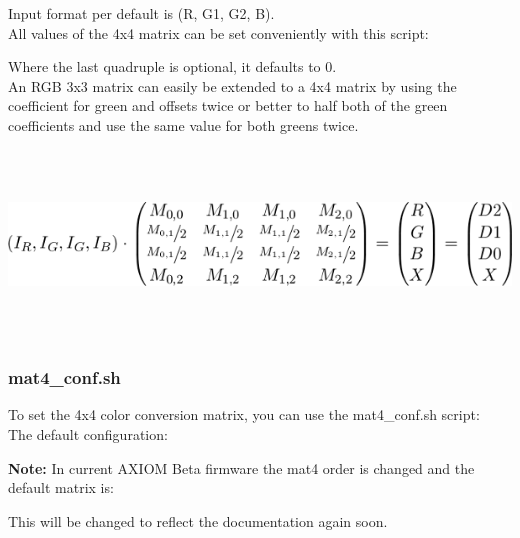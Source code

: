Input format per default is (R, G1, G2, B).\\

All values of the 4x4 matrix can be set conveniently with this script:\\

    
Where the last quadruple is optional, it defaults to 0.\\

An RGB 3x3 matrix can easily be extended to a 4x4 matrix by using the coefficient for green and offsets twice or better to half both of the green coefficients and use the same value for both greens twice. \\    
    
\begin{center}
\includegraphics[height=5cm]{images/Eqn5}
\end{center}
    
    
    
    
    
   

\subsubsection{mat4\_conf.sh}

To set the 4x4 color conversion matrix, you can use the mat4\_conf.sh script:\\

The default configuration: 


\textbf{Note:} In current AXIOM Beta firmware the mat4 order is changed and the default matrix is: 


This will be changed to reflect the documentation again soon.\\

